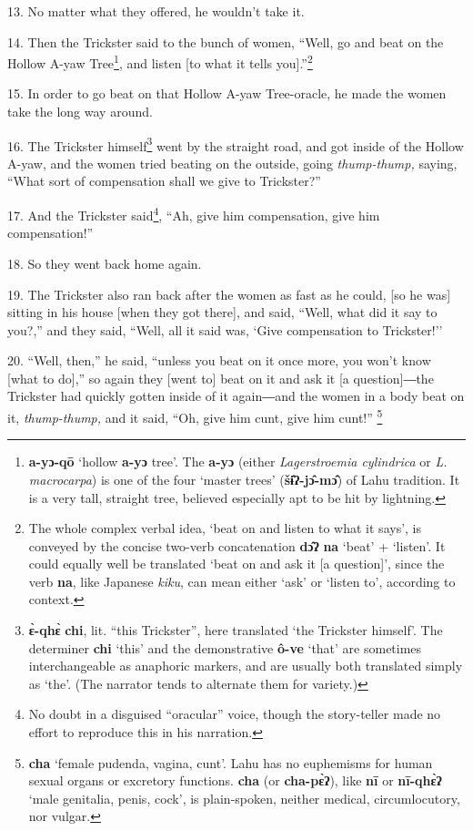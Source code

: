 13. No matter what they offered, he wouldn't take it.

14. Then the Trickster said to the bunch of women, ``Well, go and beat on the Hollow
A-yaw Tree\footnote{\textbf{a-yɔ-qō} `hollow \textbf{a-yɔ} tree'. The \textbf{a-yɔ} (either \textit{Lagerstroemia cylindrica} or \textit{L. macrocarpa}) is one of the four `master trees' (\textbf{šɨ̂ʔ-jɔ̂-mɔ̂}) of Lahu tradition. It is a very tall, straight tree, believed especially apt to be hit by lightning.}, and listen [to what it tells you].''\footnote{The whole complex verbal idea, `beat on and listen to what it says', is conveyed by the concise two-verb concatenation \textbf{dɔ̂ʔ} \textbf{na} `beat' + `listen'. It could equally well be translated `beat on and ask it [a question]', since the verb \textbf{na}, like Japanese \textit{kiku}, can mean either `ask' or `listen to', according to context.}

15. In order to go beat on that Hollow A-yaw Tree-oracle, he made the women take
the long way around.

16. The Trickster himself\footnote{\textbf{ɛ̀-qhɛ̀} \textbf{chi}, lit. ``this Trickster'', here translated `the Trickster himself'. The determiner \textbf{chi} `this' and the demonstrative \textbf{ô-ve} `that' are sometimes interchangeable as anaphoric markers, and are usually both translated simply as `the'. (The narrator tends to alternate them for variety.)} went by the straight road, and got inside of the
Hollow A-yaw, and the women tried beating on the outside, going \textit{thump-thump,
}saying, ``What sort of compensation shall we give to Trickster?''

17. And the Trickster said\footnote{No doubt in a disguised ``oracular'' voice, though the story-teller made no effort to reproduce this in his narration.}, ``Ah, give him compensation, give him compensation!''

18. So they went back home again.

19. The Trickster also ran back after the women as fast as he could, [so he was]
sitting in his house [when they got there], and said, ``Well, what did it say to
you?,'' and they said, ``Well, all it said was, `Give compensation to Trickster!''

20. ``Well, then,'' he said, ``unless you beat on it once more, you won't know
[what to do],'' so again they [went to] beat on it and ask it [a question]―the
Trickster had quickly gotten inside of it again―and the women in a body beat
on it,\textit{ thump-thump,} and it said, ``Oh, give him cunt, give him cunt!''
\footnote{\textbf{cha} `female pudenda, vagina, cunt'. Lahu has no euphemisms for human sexual organs or excretory functions. \textbf{cha} (or \textbf{cha-pɛ̀ʔ}), like \textbf{nī} or \textbf{nī-qhɛ̀ʔ} `male genitalia, penis, cock', is plain-spoken, neither medical, circumlocutory, nor vulgar.}

